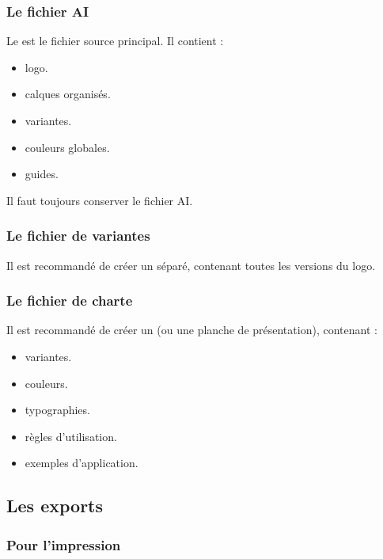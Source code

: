 \subsubsection{Le fichier AI}

Le  est le fichier source principal. Il contient :

\begin{itemize}
    \item {} logo.
    \item {} calques organisés.
    \item {} variantes.
    \item {} couleurs globales.
    \item {} guides.
\end{itemize}

Il faut toujours conserver le fichier AI.

\subsubsection{Le fichier de variantes}

Il est recommandé de créer un  séparé, contenant toutes les versions du logo.

\subsubsection{Le fichier de charte}

Il est recommandé de créer un  (ou une planche de présentation), contenant :

\begin{itemize}
    \item {} variantes.
    \item {} couleurs.
    \item {} typographies.
    \item {} règles d'utilisation.
    \item {} exemples d'application.
\end{itemize}

\subsection{Les exports}

\subsubsection{Pour l'impression}

